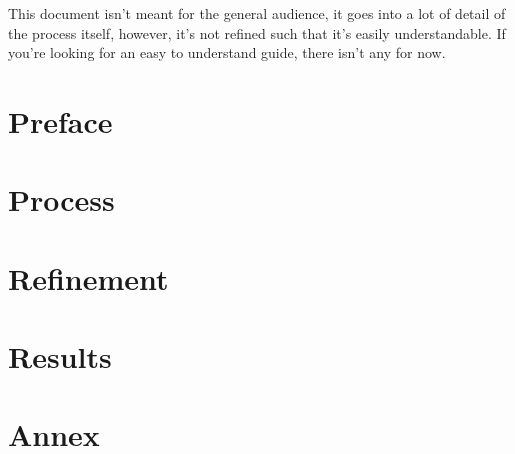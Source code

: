 \documentclass{article}
\begin{document}
	This document isn't meant for the general audience, it goes into a lot of detail of the process itself, however, it's not refined such that it's easily understandable. If you're looking for an easy to understand guide, there isn't any for now.
\newpage
\part{Preface}


\newpage


\newpage
\part{Process}
		


\newpage

\newpage

\newpage


\newpage
\part{Refinement}


\newpage
\part{Results}


\newpage
\part{Annex}

\end{document}
